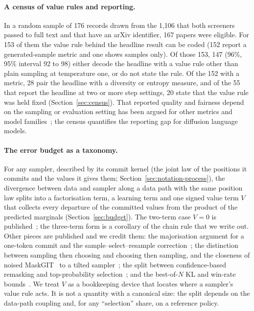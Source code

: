 \paragraph{A census of value rules and reporting.}
In a random sample of 176 records drawn from the 1,106 that both screeners passed to full text and that have an arXiv identifier, 167 papers were eligible. For 153 of them the value rule behind the headline result can be coded (152 report a generated-sample metric and one shows samples only). Of those 153, 147 (96\%, 95\% interval 92 to 98) either decode the headline with a value rule other than plain sampling at temperature one, or do not state the rule. Of the 152 with a metric, 28 pair the headline with a diversity or entropy measure, and of the 55 that report the headline at two or more step settings, 20 state that the value rule was held fixed (Section~\ref{sec:census}). %
That reported quality and fairness depend on the sampling or evaluation setting has been argued for other metrics and model families~\cite{arXiv:2606.29228,arXiv:2606.20536,arXiv:2607.24763}; the census quantifies the reporting gap for diffusion language models. %

\paragraph{The error budget as a taxonomy.}
For any sampler, described by its commit kernel (the joint law of the positions it commits and the values it gives them; Section~\ref{sec:notation-process}), the divergence between data and sampler along a data path with the same position law splits into a factorisation term, a learning term and one signed value term $V$ that collects every departure of the committed values from the product of the predicted marginals (Section~\ref{sec:budget}). The two-term case $V=0$ is published~\cite{arXiv:2505.24857}; the three-term form is a corollary of the chain rule that we write out. Other pieces are published and we credit them: the majorisation argument for a one-token commit and the sample--select--resample correction~\cite{arXiv:2605.12522}; the distinction between sampling then choosing and choosing then sampling, and the closeness of noised MaskGIT~\cite{arXiv:2202.04200} to a tilted sampler~\cite{arXiv:2510.04525}; the split between confidence-based remasking and top-probability selection~\cite{arXiv:2609.34509}; and the best-of-$N$ KL and win-rate bounds~\cite{arXiv:2401.01879}. %
We treat $V$ as a bookkeeping device that locates where a sampler's value rule acts. It is not a quantity with a canonical size: the split depends on the data-path coupling and, for any ``selection'' share, on a reference policy. %


